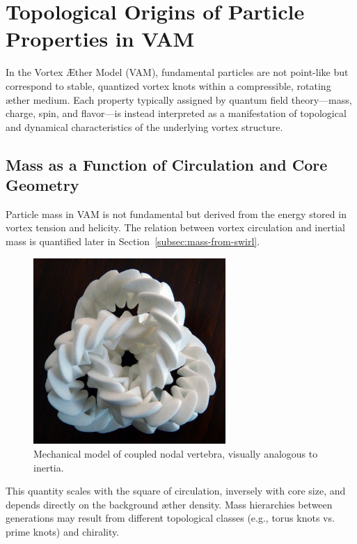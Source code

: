 \section{Topological Origins of Particle Properties in VAM}

In the Vortex Æther Model (VAM), fundamental particles are not point-like but correspond to stable, quantized vortex knots within a compressible, rotating æther medium. Each property typically assigned by quantum field theory---mass, charge, spin, and flavor---is instead interpreted as a manifestation of topological and dynamical characteristics of the underlying vortex structure.

\subsection{Mass as a Function of Circulation and Core Geometry}

Particle mass in VAM is not fundamental but derived from the energy stored in vortex tension and helicity. The relation between vortex circulation and inertial mass is quantified later in Section~\ref{subsec:mass-from-swirl}.

\begin{figure}[h!]
\centering
\includegraphics[width=0.65\textwidth]{images/mechanic_trefoil}
\caption{Mechanical model of coupled nodal vertebra, visually analogous to inertia.}
\end{figure}

This quantity scales with the square of circulation, inversely with core size, and depends directly on the background æther density. Mass hierarchies between generations may result from different topological classes (e.g., torus knots vs. prime knots) and chirality.

